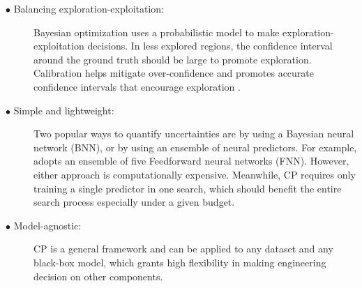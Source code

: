 \documentclass[a4paper]{scrartcl}
\begin{document}
\begin{description}
  \item[$\bullet$ Balancing exploration-exploitation:] Bayesian optimization uses a probabilistic model to make exploration-exploitation decisions. In less explored regions, the confidence interval around the ground truth should be large to promote exploration. Calibration helps mitigate over-confidence and promotes accurate confidence intervals that encourage exploration \cite{deshpande2024online}.
  
  
  \item[$\bullet$ Simple and lightweight:] Two popular ways to quantify uncertainties are by using a Bayesian neural network (BNN), or by using an ensemble of neural predictors. For example, \cite{white2019bananas} adopts an ensemble of five Feedforward neural networks (FNN). However, either approach is computationally expensive. Meanwhile, CP requires only training a single predictor in one search, which should benefit the entire search process especially under a given budget.
  \item[$\bullet$ Model-agnostic:] CP is a general framework and can be applied to any dataset and any black-box model, which grants high flexibility in making engineering decision on other components. 
\end{description} 
\end{document}
